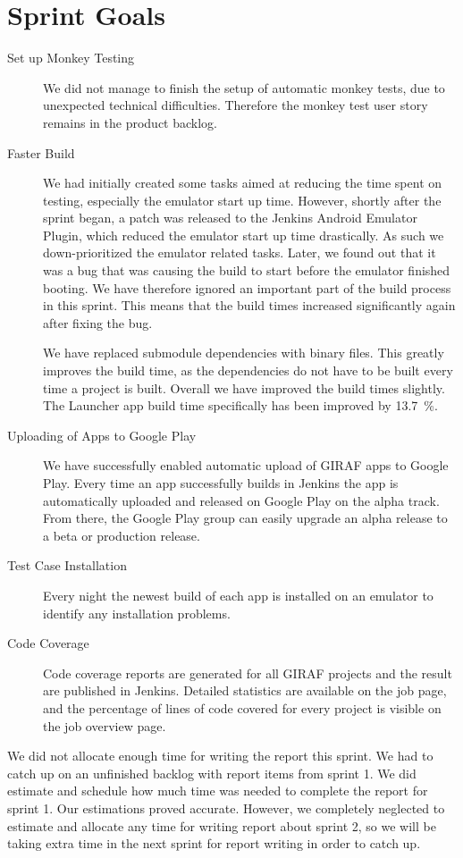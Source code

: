 \section{Sprint Goals}\label{sec:s2_goals}
\begin{description}
    \item[Set up Monkey Testing] We did not manage to finish the setup of automatic monkey tests, due to unexpected technical difficulties. Therefore the monkey test user story remains in the product backlog.
    \item[Faster Build] We had initially created some tasks aimed at reducing the time spent on testing, especially the emulator start up time. However, shortly after the sprint began, a patch was released to the Jenkins Android Emulator Plugin, which reduced the emulator start up time drastically. As such we down-prioritized the emulator related tasks. Later, we found out that it was a bug that was causing the build to start before the emulator finished booting. We have therefore ignored an important part of the build process in this sprint. This means that the build times increased significantly again after fixing the bug.

    We have replaced submodule dependencies with binary files. This greatly improves the build time, as the dependencies do not have to be built every time a project is built. Overall we have improved the build times slightly. The Launcher app build time specifically has been improved by \SI{13.7}{\percent}.
    \item[Uploading of Apps to Google Play] We have successfully enabled automatic upload of GIRAF apps to Google Play. Every time an app successfully builds in Jenkins the app is automatically uploaded and released on Google Play on the alpha track. From there, the Google Play group can easily upgrade an alpha release to a beta or production release.
    \item[Test Case Installation] Every night the newest build of each app is installed on an emulator to identify any installation problems.
    \item[Code Coverage] Code coverage reports are generated for all GIRAF projects and the result are published in Jenkins. Detailed statistics are available on the job page, and the percentage of lines of code covered for every project is visible on the job overview page.
\end{description}

We did not allocate enough time for writing the report this sprint. We had to catch up on an unfinished backlog with report items from sprint 1. We did estimate and schedule how much time was needed to complete the report for sprint 1. Our estimations proved accurate. However, we completely neglected to estimate and allocate any time for writing report about sprint 2, so we will be taking extra time in the next sprint for report writing in order to catch up.

